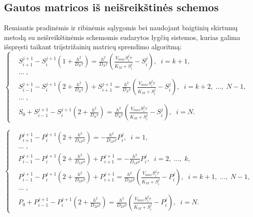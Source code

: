 \documentclass[12pt, a4paper, lithuanian]{article}
\begin{document}
\subsection{Gautos matricos iš neišreikštinės schemos}

Remiantis pradinėmis ir ribinėmis sąlygomis bei naudojant baigtinių skirtumų
metodą su neišreikštinėmis schemomis sudarytos lygčių sistemos, kurias galima
išspręsti taikant triįstrižainių matricų sprendimo algoritmą:
\begin{equation}\label{eq:S}
\left\{
\begin{aligned}
    &S_{i+1}^{j+1}-S_i^{j+1}\left(1+\frac{h^2}{D_S\tau}\right)
= \frac{h^2}{D_S\tau} \left(\frac{V_{max}S_i^j\tau}{K_M+S_i^j}-S_i^j\right),\; \;
i = k +1,\\
    &\dots\;,\\
    &S_{i-1}^{j+1}-S_i^{j+1}\left(2+\frac{h^2}{D_S\tau}\right)+S_{i+1}^{j+1}
        = \frac{h^2}{D_S\tau}
        \left(\frac{V_{max}S_i^j\tau}{K_M+S_i^j}-S_i^j\right),\; \; i =
        k +2,\;...,\;N-1,\\
    &\dots\;,\\
    &S_0 + S_{i-1}^{j+1} - S_i^{j+1}\left(2+\frac{h^2}{D_S\tau}\right)
        =  \frac{h^2}{D_S\tau}
    \left(\frac{V_{max}S_i^j\tau}{K_M+S_i^j}-S_i^j\right),\; \; i = N.
\end{aligned}
\right.
\end{equation}

\begin{equation}\label{eq:P}
\left\{
\begin{aligned}
    &P_{i+1}^{j+1}-P_i^{j+1}\left(2+\frac{h^2}{D_{1P}\tau}\right)
    = -\frac{h^2}{D_{1P}\tau} P_i^j,\; \; i = 1,\\
    &\dots\;,\\
    &P_{i-1}^{j+1}-P_i^{j+1}\left(2+\frac{h^2}{D_{1P}\tau}\right)+P_{i+1}^{j+1}
    =-\frac{h^2}{D_{1P}\tau} P_i^j,\; \; i = 2,\;...,\;k,\\
    &P_{i-1}^{j+1}-P_i^{j+1}\left(2+\frac{h^2}{D_{2P}\tau}\right)+P_{i+1}^{j+1}
    = \frac{h^2}{D_{2P}\tau}
    \left(\frac{V_{max}S_i^j\tau}{K_M+S_i^j}-P_i^j\right),\; \; i =
        k +1,\;...,\;N-1,\\
    &\dots\;,\\
    &P_0 + P_{i-1}^{j+1} - P_i^{j+1}\left(2+\frac{h^2}{D_{2P}\tau}\right)
        =  \frac{h^2}{D_{2P}\tau}
        \left(\frac{V_{max}S_i^j\tau}{K_M+S_i^j}-P_i^j\right),\; \; i = N.
\end{aligned}
\right.
\end{equation}
\end{document}
